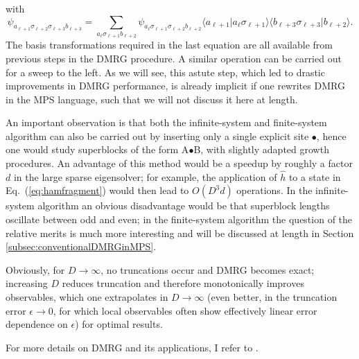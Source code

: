 \documentclass[a4paper,10pt,oneside,onecolumn,1p,times]{elsarticle}
\newcommand{\braket}[2]{\mbox{$\langle #1  | #2 \rangle$}} 	%
\begin{document}
with
\begin{equation}
\psi_{a_{\ell+1}\sigma_{\ell+2}\sigma_{\ell+3}b_{\ell+3}} =
\sum_{a_\ell \sigma_{\ell+1} b_{\ell+2}} 
\psi_{a_\ell\sigma_{\ell+1}\sigma_{\ell+2}b_{\ell+2}}  
\braket{a_{\ell+1}}{a_\ell \sigma_{\ell+1}} \braket{b_{\ell+3}\sigma_{\ell+3}}{b_{\ell+2}} . 
\end{equation}
The basis transformations required in the last equation are all available from previous steps in the DMRG procedure. A similar operation can be carried out for a sweep to the left. As we will see, this astute step, which led to drastic improvements in DMRG performance, is already implicit if one rewrites DMRG in the MPS language, such that we will not discuss it here at length.

An important observation is that both the infinite-system and finite-system algorithm can also be carried out by inserting only a single explicit site $\bullet$, hence one would study superblocks of the form A$\bullet$B, with slightly adapted growth procedures. An advantage of this method would be a speedup by roughly a factor $d$ in the large sparse eigensolver; for example, the application of $\hat{h}$ to a state in Eq.~(\ref{eq:hamfragment}) would then lead to $O(D^3 d)$ operations.
In the infinite-system algorithm an obvious disadvantage would be that superblock lengths oscillate between odd and even; in the finite-system algorithm the question of the relative merits is much more interesting and will be discussed at length in Section \ref{subsec:conventionalDMRGinMPS}.

Obviously, for $D\rightarrow\infty$, no truncations occur and DMRG becomes exact; increasing $D$ reduces truncation and therefore monotonically improves observables, which one extrapolates in $D\rightarrow\infty$ (even better, in the truncation error $\epsilon\rightarrow 0$, for which local observables often show effectively linear error dependence on $\epsilon$) for optimal results.

For more details on DMRG and its applications, I refer to \cite{Schollwoeck05}. 
  
\end{document}
